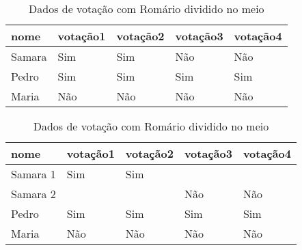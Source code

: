 {\begin{table}
  \begin{minipage}{\textwidth}
    \centering
    \begin{tabular}{ l l l l l }
      nome & votação1 & votação2 & votação3 & votação4 \\
      \hline
      Samara & Sim & Sim & Não & Não \\
      Pedro & Sim & Sim & Sim & Sim \\
      Maria & Não & Não & Não & Não \\
    \end{tabular}
    \caption{Dados originais de votação}
    \label{table:exemplo-mudanca-de-comportamento}
  \end{minipage}
  \begin{minipage}{\textwidth}
    \centering
    \begin{tabular}{ l l l l l }
      nome & votação1 & votação2 & votação3 & votação4 \\
      \hline
      Samara 1 & Sim & Sim & & \\
      Samara 2 & & & Não & Não \\
      Pedro & Sim & Sim & Sim & Sim \\
      Maria & Não & Não & Não & Não \\
    \end{tabular}
    \caption{Dados de votação com Romário dividido no meio}
    \label{table:exemplo-parlamentar-virtual}
  \end{minipage}
\end{table}

\begin{knitrout}
\color{fgcolor}\begin{kframe}
\begin{alltt}
 \hlkwb{=} \hlstd{(}
   \hlstd{=} \hlstd{(}\hlstd{(}\hlstd{,} \hlstd{,} \hlstd{)),}
   \hlstd{=} \hlstd{(}\hlstd{,} \hlstd{,} \hlopt{-}\hlstd{,} \hlopt{-}\hlstd{,} \hlstd{,} \hlopt{-}\hlstd{),}
   \hlstd{=} \hlstd{(}\hlstd{(}\hlstd{,} \hlstd{),} \hlstd{)}
\hlstd{)}
 \hlstd{(}      \hlopt{+}
  \hlstd{()} \hlopt{+}
  \hlstd{()} \hlopt{+}
  \hlstd{(} \hlstd{=} \hlstd{())} \hlopt{+}
  \hlstd{(} \hlstd{=} \hlstd{,}  \hlstd{=} \hlstd{)}
\end{alltt}



\end{kframe}
\end{knitrout}}
